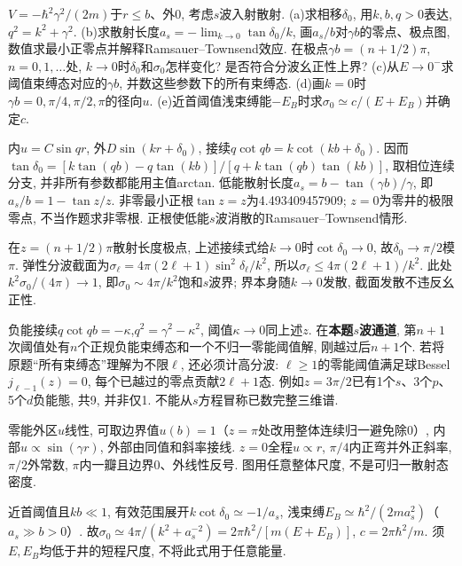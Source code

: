 \begin{exercise}
$V=-\hbar^2\gamma^2/(2m)$于$r\le b$、外0, 考虑$s$波入射散射. (a)求相移$\delta_0$, 用$k,b,q>0$表达, $q^2=k^2+\gamma^2$. (b)求散射长度$a_s=-\lim_{k\to0}\tan\delta_0/k$, 画$a_s/b$对$\gamma b$的零点、极点图, 数值求最小正零点并解释Ramsauer--Townsend效应. 在极点$\gamma b=(n+1/2)\pi$, $n=0,1,\ldots$处, $k\to0$时$\delta_0$和$\sigma_0$怎样变化? 是否符合分波幺正性上界? (c)从$E\to0^-$求阈值束缚态对应的$\gamma b$, 并数这些参数下的所有束缚态. (d)画$k=0$时$\gamma b=0,\pi/4,\pi/2,\pi$的径向$u$. (e)近首阈值浅束缚能$-E_B$时求$\sigma_0\simeq c/(E+E_B)$并确定$c$.
\end{exercise}
\begin{solution}
内$u=C\sin qr$, 外$D\sin(kr+\delta_0)$, 接续$q\cot qb=k\cot(kb+\delta_0)$. 因而$\tan\delta_0=[k\tan(qb)-q\tan(kb)]/[q+k\tan(qb)\tan(kb)]$, 取相位连续分支, 并非所有参数都能用主值arctan. 低能散射长度$a_s=b-\tan(\gamma b)/\gamma$, 即$a_s/b=1-\tan z/z$. 非零最小正根$\tan z=z$为4.493409457909; $z=0$为零井的极限零点, 不当作题求非零根. 正根使低能$s$波消散的Ramsauer--Townsend情形.

在$z=(n+1/2)\pi$散射长度极点, 上述接续式给$k\to0$时$\cot\delta_0\to0$, 故$\delta_0\to\pi/2$模$\pi$. 弹性分波截面为$\sigma_\ell=4\pi(2\ell+1)\sin^2\delta_\ell/k^2$, 所以$\sigma_\ell\le4\pi(2\ell+1)/k^2$. 此处$k^2\sigma_0/(4\pi)\to1$, 即$\sigma_0\sim4\pi/k^2$饱和$s$波界; 界本身随$k\to0$发散, 截面发散不违反幺正性.

负能接续$q\cot qb=-\kappa$,$q^2=\gamma^2-\kappa^2$, 阈值$\kappa\to0$同上述$z$. 在\textbf{本题$s$波通道}, 第$n+1$次阈值处有$n$个正规负能束缚态和一个不归一零能阈值解, 刚越过后$n+1$个. 若将原题“所有束缚态”理解为不限$\ell$, 还必须计高分波: $\ell\ge1$的零能阈值满足球Bessel $j_{\ell-1}(z)=0$, 每个已越过的零点贡献$2\ell+1$态. 例如$z=3\pi/2$已有1个$s$、3个$p$、5个$d$负能態, 共9, 并非仅1. 不能从$s$方程冒称已数完整三维谱.

零能外区$u$线性, 可取边界值$u(b)=1$（$z=\pi$处改用整体连续归一避免除0）, 内部$u\propto\sin(\gamma r)$, 外部由同值和斜率接线. $z=0$全程$u\propto r$, $\pi/4$内正弯并外正斜率, $\pi/2$外常数, $\pi$内一瓣且边界0、外线性反号. 图用任意整体尺度, 不是可归一散射态密度.

近首阈值且$kb\ll1$, 有效范围展开$k\cot\delta_0\simeq-1/a_s$, 浅束缚$E_B\simeq\hbar^2/(2ma_s^2)$（$a_s\gg b>0$）. 故$\sigma_0\simeq4\pi/(k^2+a_s^{-2})=2\pi\hbar^2/[m(E+E_B)]$, $c=2\pi\hbar^2/m$. 须$E,E_B$均低于井的短程尺度, 不将此式用于任意能量.

\end{solution}
